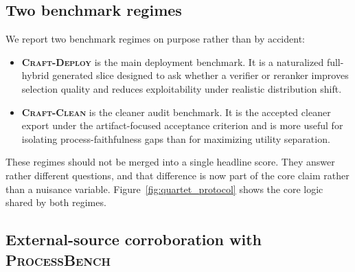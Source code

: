\subsection{Two benchmark regimes}

We report two benchmark regimes on purpose rather than by accident:
\begin{itemize}[leftmargin=1.5em]
\item \textbf{\textsc{Craft-Deploy}} is the main deployment benchmark. It is a
naturalized full-hybrid generated slice designed to ask whether a verifier or
reranker improves selection quality and reduces exploitability under realistic
distribution shift.
\item \textbf{\textsc{Craft-Clean}} is the cleaner audit benchmark. It is the
accepted cleaner export under the artifact-focused acceptance criterion
and is more useful for isolating process-faithfulness gaps than for maximizing
utility separation.
\end{itemize}
These regimes should not be merged into a single headline score. They answer
rather different questions, and that difference is now part of the core claim
rather than a nuisance variable. Figure~\ref{fig:quartet_protocol} shows the
core logic shared by both regimes.

\subsection{External-source corroboration with \textsc{ProcessBench}}

